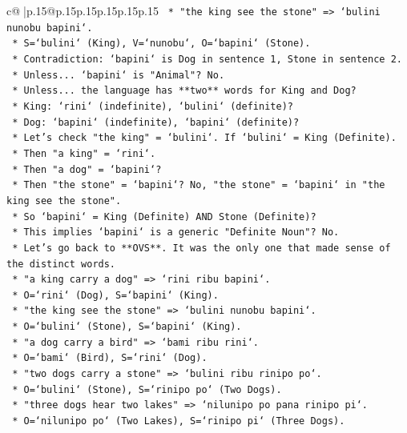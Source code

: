\documentclass{article}
\begin{document}
{\begin{supertabular}{c@{$\;$}|p{.15\linewidth}@{}p{.15\linewidth}p{.15\linewidth}p{.15\linewidth}p{.15\linewidth}p{.15\linewidth}}
{{{\texttt{    *   "the king see the stone" => `bulini nunobu bapini`.} \\
\texttt{        *   S=`bulini` (King), V=`nunobu`, O=`bapini` (Stone).} \\
\texttt{        *   Contradiction: `bapini` is Dog in sentence 1, Stone in sentence 2.} \\
\texttt{    *   Unless... `bapini` is "Animal"? No.} \\
\texttt{    *   Unless... the language has **two** words for King and Dog?} \\
\texttt{        *   King: `rini` (indefinite), `bulini` (definite)?} \\
\texttt{        *   Dog: `bapini` (indefinite), `bapini` (definite)?} \\
\texttt{        *   Let's check "the king" = `bulini`. If `bulini` = King (Definite).} \\
\texttt{        *   Then "a king" = `rini`.} \\
\texttt{        *   Then "a dog" = `bapini`?} \\
\texttt{        *   Then "the stone" = `bapini`? No, "the stone" = `bapini` in "the king see the stone".} \\
\texttt{        *   So `bapini` = King (Definite) AND Stone (Definite)?} \\
\texttt{        *   This implies `bapini` is a generic "Definite Noun"? No.} \\
\texttt{    *   Let's go back to **OVS**. It was the only one that made sense of the distinct words.} \\
\texttt{    *   "a king carry a dog" => `rini ribu bapini`.} \\
\texttt{        *   O=`rini` (Dog), S=`bapini` (King).} \\
\texttt{    *   "the king see the stone" => `bulini nunobu bapini`.} \\
\texttt{        *   O=`bulini` (Stone), S=`bapini` (King).} \\
\texttt{    *   "a dog carry a bird" => `bami ribu rini`.} \\
\texttt{        *   O=`bami` (Bird), S=`rini` (Dog).} \\
\texttt{    *   "two dogs carry a stone" => `bulini ribu rinipo po`.} \\
\texttt{        *   O=`bulini` (Stone), S=`rinipo po` (Two Dogs).} \\
\texttt{    *   "three dogs hear two lakes" => `nilunipo po pana rinipo pi`.} \\
\texttt{        *   O=`nilunipo po` (Two Lakes), S=`rinipo pi` (Three Dogs).} \\
}}}
\end{supertabular}}
\end{document}
